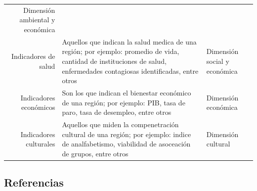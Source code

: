 \documentclass[12pt]{article}
\begin{document}
\begin{longtable}[]{@{}rll@{}}
\begin{minipage}[t]{0.27\columnwidth}
	Dimensión ambiental y económica\strut
	\end{minipage}\tabularnewline
	\begin{minipage}[t]{0.37\columnwidth}\raggedleft
	Indicadores de salud\strut
	\end{minipage} & \begin{minipage}[t]{0.27\columnwidth}\raggedright
	Aquellos que indican la salud medica de una región; por ejemplo:
	promedio de vida, cantidad de instituciones de salud, enfermedades
	contagiosas identificadas, entre otros\strut
	\end{minipage} & \begin{minipage}[t]{0.27\columnwidth}\raggedright
	Dimensión social y económica\strut
	\end{minipage}\tabularnewline
	\begin{minipage}[t]{0.37\columnwidth}\raggedleft
	Indicadores económicos\strut
	\end{minipage} & \begin{minipage}[t]{0.27\columnwidth}\raggedright
	Son los que indican el bienestar económico de una región; por ejemplo:
	PIB, tasa de paro, tasa de desempleo, entre otros\strut
	\end{minipage} & \begin{minipage}[t]{0.27\columnwidth}\raggedright
	Dimensión económica\strut
	\end{minipage}\tabularnewline
	\begin{minipage}[t]{0.37\columnwidth}\raggedleft
	Indicadores culturales\strut
	\end{minipage} & \begin{minipage}[t]{0.27\columnwidth}\raggedright
	Aquellos que miden la compenetración cultural de una región; por
	ejemplo: indice de analfabetismo, viabilidad de asoceación de grupos,
	entre otros\strut
	\end{minipage} & \begin{minipage}[t]{0.27\columnwidth}\raggedright
	Dimensión cultural\strut
	\end{minipage}\tabularnewline

\end{longtable}


\subsection*{Referencias}
\end{document}

